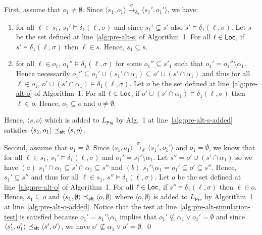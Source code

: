 \documentclass{LMCS}
\newcommand{\Pre}{\mathsf{Pre}}
\renewcommand{\l}{{\ell}}
\newcommand{\Loc}{{\sf Loc}}
\newcommand{\tuple}[1]{\langle #1 \rangle}
\begin{document}
First, assume that $o_1 \neq \emptyset$.
Since $\tuple{s_1,o_1} \xrightarrow{\sigma}_{\delta_2} \tuple{s_1',o_1'}$,
we have:
\begin{enumerate}[$(i)$]  
\item for all $\l \in s_1$, $s_1' \models \delta_1(\l,\sigma)$ and since 
$s_1' \subseteq s'$ also $s' \models \delta_1(\l,\sigma)$. Let $s$
be the set defined at line~\ref{alg:pre-alt-s} of Algorithm~1.
For all $\l \in \Loc$, if $s' \models \delta_1(\l,\sigma)$ then $\l \in s$.
Hence, $s_1 \subseteq s$.

\item for all $\l \in o_1$, $o_1'' \models \delta_1(\l,\sigma)$
for some $o_1'' \subseteq s'_1$ such that $o_1' = o_1'' \setminus \alpha_1$. 
Hence necessarily $o_1'' \subseteq o_1' \cup (s_1' \cap \alpha_1) \subseteq o' \cup (s' \cap \alpha_1)$
and thus for all $\l \in o_1$, $o' \cup (s' \cap \alpha_1) \models \delta_1(\l,\sigma)$.
Let $o$ be the set defined at line~\ref{alg:pre-alt-o} of Algorithm~1.
For all $\l \in \Loc$, if $o' \cup (s' \cap \alpha_1) \models \delta_1(\l,\sigma)$ 
then $\l \in o$. Hence, $o_1 \subseteq o$ and $o \neq \emptyset$.
\end{enumerate}
\noindent
Hence, $\tuple{s,o}$ which is added to $L_{\Pre}$ by Alg.~1 at 
line~\ref{alg:pre-alt-s-added} satisfies $\tuple{s_1,o_1} \preceq_{{\sf alt}} \tuple{s,o}$.

Second, assume that $o_1 = \emptyset$. 
Since $\tuple{s_1,o_1} \xrightarrow{\sigma}_{\delta'} \tuple{s_1',o_1'}$ and $o_1 = \emptyset$,
we know that for all $\l \in s_1$, $s_1' \models \delta_1(\l,\sigma)$ and 
$o_1' = s_1' \setminus \alpha_1$. Let $s'' = o' \cup (s' \cap \alpha_1)$ so we have 
$(a)$ $s_1' \cap \alpha_1 \subseteq s' \cap \alpha_1 \subseteq s''$ and 
$(b)$ $s_1' \setminus \alpha_1 = o_1' \subseteq o'  \subseteq s''$.
Hence, $s_1' \subseteq s''$ and thus for all $\l \in s_1$, $s'' \models \delta_1(\l,\sigma)$.
Let $o$ be the set defined at line~\ref{alg:pre-alt-o} of Algorithm~1.
For all $\l \in \Loc$, if $s'' \models \delta_1(\l,\sigma)$ 
then $\l \in o$. Hence, $s_1 \subseteq o$ and 
$\tuple{s_1,\emptyset} \preceq_{{\sf alt}} \tuple{o, \emptyset}$ where $\tuple{o, \emptyset}$
is added to $L_{\Pre}$ by Algorithm~1 at line~\ref{alg:pre-alt-o-added}.
Notice that the test at line~\ref{alg:pre-alt-simulation-test} is satisfied because
$o_1' = s_1' \setminus \alpha_1$ implies that $o_1' \not\subseteq \alpha_1 \lor 
o_1' = \emptyset$ and since $\tuple{s_1',o_1'} \preceq_{{\sf alt}} \tuple{s',o'}$,
we have $o' \not\subseteq \alpha_1 \lor o' = \emptyset$.
\qed
\end{document}
